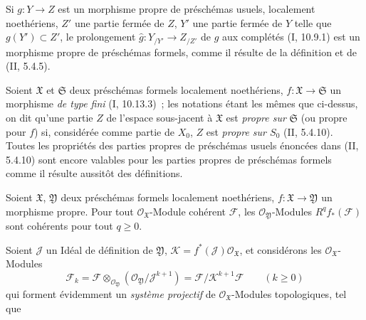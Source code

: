 \begin{env}[3.4.1]
Si $g:Y\to Z$ est un morphisme propre de préschémas usuels, localement
noethériens, $Z'$ une partie fermée de $Z$, $Y'$ une partie fermée de $Y$
telle que $g(Y')\subset Z'$, le prolongement
$\widehat g:Y_{/Y'}\to Z_{/Z'}$ de $g$ aux complétés (I, 10.9.1) est un
morphisme propre de préschémas formels, comme il résulte de la définition et
de (II, 5.4.5).

Soient $\mathfrak X$ et $\mathfrak S$ deux préschémas formels localement
noethériens, $f:\mathfrak X\to\mathfrak S$ un morphisme \emph{de type fini}
(I, 10.13.3)~; les notations étant les mêmes que ci-dessus, on dit qu'une
partie $Z$ de l'espace sous-jacent à $\mathfrak X$ est \emph{propre sur}
$\mathfrak S$ (ou propre pour $f$) si, considérée comme partie de $X_0$, $Z$
est \emph{propre sur $S_0$} (II, 5.4.10). Toutes les propriétés des parties
propres de préschémas usuels énoncées dans (II, 5.4.10) sont encore valables
pour les parties propres de préschémas formels comme il résulte aussitôt des
définitions.
\end{env}

\begin{theorem}[3.4.2]
\label{III.3.4.2-fr}
Soient $\mathfrak X$, $\mathfrak Y$ deux préschémas formels localement
noethériens, $f:\mathfrak X\to\mathfrak Y$ un morphisme propre. Pour tout
$\mathcal O_{\mathfrak X}$-Module cohérent $\mathcal F$, les
$\mathcal O_{\mathfrak Y}$-Modules $R^qf_*(\mathcal F)$ sont cohérents pour
tout $q\geq0$.
\end{theorem}

Soient $\mathcal J$ un Idéal de définition de $\mathfrak Y$,
$\mathcal K=f^*(\mathcal J)\mathcal O_{\mathfrak X}$, et considérons les
$\mathcal O_{\mathfrak X}$-Modules
\[
\mathcal F_k=\mathcal F\otimes_{\mathcal O_{\mathfrak Y}}
(\mathcal O_{\mathfrak Y}/\mathcal J^{k+1})
=\mathcal F/\mathcal K^{k+1}\mathcal F\qquad(k\geq0)
\tag{3.4.2.1}\label{III.3.4.2.1-fr}
\]
qui forment évidemment un \emph{système projectif} de
$\mathcal O_{\mathfrak X}$-Modules topologiques, tel que


